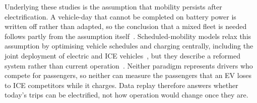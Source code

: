 \documentclass{elsarticle}
\begin{document}
Underlying these studies is the assumption that mobility persists after electrification. A vehicle-day that cannot be completed on battery power is written off rather than adapted, so the conclusion that a mixed fleet is needed follows partly from the assumption itself~\cite{sello2026_planning_paradigms}. Scheduled-mobility models relax this assumption by optimising vehicle schedules and charging centrally, including the joint deployment of electric and ICE vehicles~\cite{pretorius2024_scheduling_mixed_fleets, wust2025_mbt_scheduling}, but they describe a reformed system rather than current operation~\cite{booysen2025_sys_of_sys_em_planning}. Neither paradigm represents drivers who compete for passengers, so neither can measure the passengers that an EV loses to ICE competitors while it charges. Data replay therefore answers whether today's trips can be electrified, not how operation would change once they are.
\end{document}
